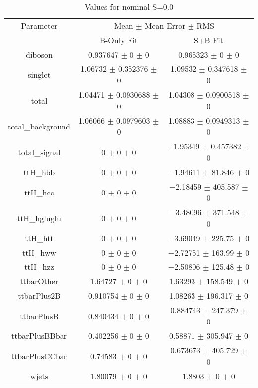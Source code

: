 \begin{table}
\centering
\caption{Values for nominal S=0.0}
\begin{tabular}{ccc}
\toprule
Parameter & \multicolumn{2}{c}{Mean $\pm$ Mean Error $\pm$ RMS}\\
 & B-Only Fit & S+B Fit\\
\midrule
diboson & \num{0.937647} $\pm$ \num{0} $\pm$ \num{0} & \num{0.965323} $\pm$ \num{0} $\pm$ \num{0}\\
singlet & \num{1.06732} $\pm$ \num{0.352376} $\pm$ \num{0} & \num{1.09532} $\pm$ \num{0.347618} $\pm$ \num{0}\\
total & \num{1.04471} $\pm$ \num{0.0930688} $\pm$ \num{0} & \num{1.04308} $\pm$ \num{0.0900518} $\pm$ \num{0}\\
total\_background & \num{1.06066} $\pm$ \num{0.0979603} $\pm$ \num{0} & \num{1.08883} $\pm$ \num{0.0949313} $\pm$ \num{0}\\
total\_signal & \num{0} $\pm$ \num{0} $\pm$ \num{0} & \num{-1.95349} $\pm$ \num{0.457382} $\pm$ \num{0}\\
ttH\_hbb & \num{0} $\pm$ \num{0} $\pm$ \num{0} & \num{-1.94611} $\pm$ \num{81.846} $\pm$ \num{0}\\
ttH\_hcc & \num{0} $\pm$ \num{0} $\pm$ \num{0} & \num{-2.18459} $\pm$ \num{405.587} $\pm$ \num{0}\\
ttH\_hgluglu & \num{0} $\pm$ \num{0} $\pm$ \num{0} & \num{-3.48096} $\pm$ \num{371.548} $\pm$ \num{0}\\
ttH\_htt & \num{0} $\pm$ \num{0} $\pm$ \num{0} & \num{-3.69049} $\pm$ \num{225.75} $\pm$ \num{0}\\
ttH\_hww & \num{0} $\pm$ \num{0} $\pm$ \num{0} & \num{-2.72751} $\pm$ \num{163.99} $\pm$ \num{0}\\
ttH\_hzz & \num{0} $\pm$ \num{0} $\pm$ \num{0} & \num{-2.50806} $\pm$ \num{125.48} $\pm$ \num{0}\\
ttbarOther & \num{1.64727} $\pm$ \num{0} $\pm$ \num{0} & \num{1.63293} $\pm$ \num{158.549} $\pm$ \num{0}\\
ttbarPlus2B & \num{0.910754} $\pm$ \num{0} $\pm$ \num{0} & \num{1.08263} $\pm$ \num{196.317} $\pm$ \num{0}\\
ttbarPlusB & \num{0.840434} $\pm$ \num{0} $\pm$ \num{0} & \num{0.884743} $\pm$ \num{247.379} $\pm$ \num{0}\\
ttbarPlusBBbar & \num{0.402256} $\pm$ \num{0} $\pm$ \num{0} & \num{0.58871} $\pm$ \num{305.947} $\pm$ \num{0}\\
ttbarPlusCCbar & \num{0.74583} $\pm$ \num{0} $\pm$ \num{0} & \num{0.673673} $\pm$ \num{405.729} $\pm$ \num{0}\\
wjets & \num{1.80079} $\pm$ \num{0} $\pm$ \num{0} & \num{1.8803} $\pm$ \num{0} $\pm$ \num{0}\\
\bottomrule
\end{tabular}
\end{table}